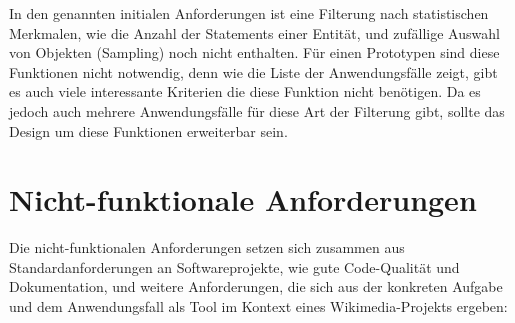 In den genannten initialen Anforderungen ist eine Filterung nach statistischen Merkmalen, wie die Anzahl der Statements einer Entität, und zufällige Auswahl von Objekten (Sampling) noch nicht enthalten.
Für einen Prototypen sind diese Funktionen nicht notwendig, denn wie die Liste der Anwendungsfälle zeigt, gibt es auch viele interessante Kriterien die diese Funktion nicht benötigen.
Da es jedoch auch mehrere Anwendungsfälle für diese Art der Filterung gibt, sollte das Design um diese Funktionen erweiterbar sein.

\section{Nicht-funktionale Anforderungen}
Die nicht-funktionalen Anforderungen setzen sich zusammen aus Standardanforderungen an Softwareprojekte, wie gute Code-Qualität und Dokumentation, und weitere Anforderungen, die sich aus der konkreten Aufgabe und dem Anwendungsfall als Tool im Kontext eines Wikimedia-Projekts ergeben:
